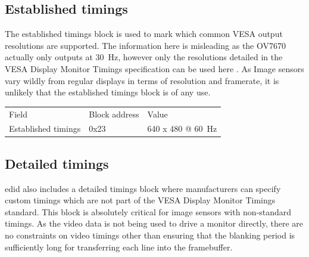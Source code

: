 \subsection{Established timings}
The established timings block is used to mark which common VESA output resolutions are supported. The information here is misleading as the OV7670 actually only outputs at \SI{30}{\hertz}, however only the resolutions detailed in the VESA Display Monitor Timings specification can be used here \cite{video_timing}. As Image sensors vary wildly from regular displays in terms of resolution and framerate, it is unlikely that the established timings block is of any use.

\begin{table}
    \begin{tabular}{lll}
        Field               & Block address             & Value                         \\
        Established timings & 0x23                      & 640 x 480 @ \SI{60}{\hertz}   \\
    \end{tabular}
\end{table}

\subsection{Detailed timings}
\Gls{edid} also includes a detailed timings block where manufacturers can specify custom timings which are not part of the VESA Display Monitor Timings standard. This block is absolutely critical for image sensors with non-standard timings. As the video data is not being used to drive a monitor directly, there are no constraints on video timings other than ensuring that the blanking period is sufficiently long for transferring each line into the framebuffer.

